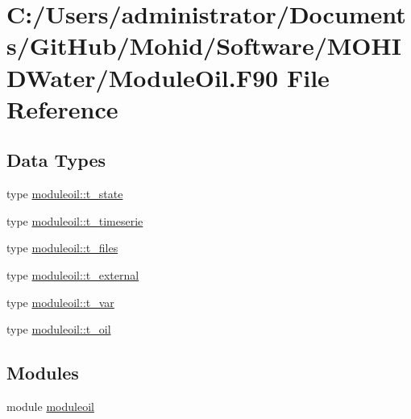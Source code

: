 \hypertarget{_module_oil_8_f90}{}\section{C\+:/\+Users/administrator/\+Documents/\+Git\+Hub/\+Mohid/\+Software/\+M\+O\+H\+I\+D\+Water/\+Module\+Oil.F90 File Reference}
\label{_module_oil_8_f90}
\subsection*{Data Types}
\begin{DoxyCompactItemize}
\item 
type \mbox{\hyperlink{structmoduleoil_1_1t__state}{moduleoil\+::t\+\_\+state}}
\item 
type \mbox{\hyperlink{structmoduleoil_1_1t__timeserie}{moduleoil\+::t\+\_\+timeserie}}
\item 
type \mbox{\hyperlink{structmoduleoil_1_1t__files}{moduleoil\+::t\+\_\+files}}
\item 
type \mbox{\hyperlink{structmoduleoil_1_1t__external}{moduleoil\+::t\+\_\+external}}
\item 
type \mbox{\hyperlink{structmoduleoil_1_1t__var}{moduleoil\+::t\+\_\+var}}
\item 
type \mbox{\hyperlink{structmoduleoil_1_1t__oil}{moduleoil\+::t\+\_\+oil}}
\end{DoxyCompactItemize}
\subsection*{Modules}
\begin{DoxyCompactItemize}
\item 
module \mbox{\hyperlink{namespacemoduleoil}{moduleoil}}
\end{DoxyCompactItemize}
